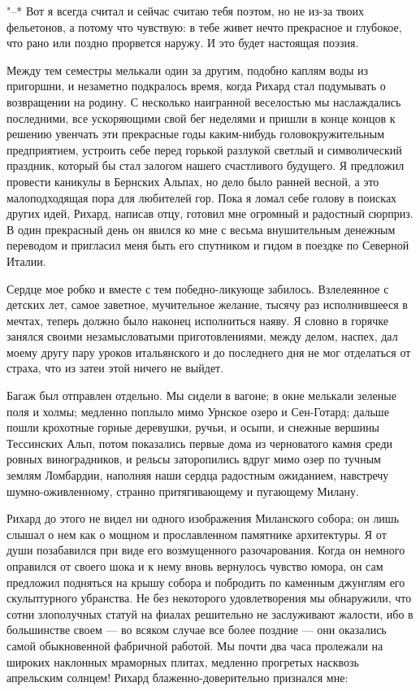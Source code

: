 "--* Вот  я всегда  считал и  сейчас считаю тебя  поэтом, но  не из-за
твоих фельетонов, а потому что чувствую: в тебе живет нечто прекрасное
и  глубокое,  что  рано  или  поздно прорвется  наружу.  И  это  будет
настоящая поэзия.

Между тем  семестры мелькали  один за другим,  подобно каплям  воды из
пригоршни, и незаметно подкралось  время, когда Рихард стал подумывать
о  возвращении  на  родину.   С  несколько  наигранной  веселостью  мы
наслаждались последними, все ускоряющими свой  бег неделями и пришли в
конце  концов  к решению  увенчать  эти  прекрасные годы  каким-нибудь
головокружительным предприятием, устроить  себе перед горькой разлукой
светлый  и  символический праздник,  который  бы  стал залогом  нашего
счастливого будущего. Я предложил провести каникулы в Бернских Альпах,
но дело  было ранней весной,  а это малоподходящая пора  для любителей
гор. Пока я  ломал себе голову в поисках других  идей, Рихард, написав
отцу, готовил мне огромный и радостный сюрприз. В один прекрасный день
он явился ко мне с  весьма внушительным денежным переводом и пригласил
меня быть его спутником и гидом в поездке по Северной Италии.

Сердце мое робко и вместе  с тем победно-ликующе забилось. Взлелеянное
с  детских  лет,  самое  заветное,  мучительное  желание,  тысячу  раз
исполнившееся в мечтах, теперь  должно было наконец исполниться наяву.
Я  словно в  горячке занялся  своими незамысловатыми  приготовлениями,
между делом,  наспех, дал  моему другу пару  уроков итальянского  и до
последнего дня не  мог отделаться от страха, что из  затеи этой ничего
не выйдет.

Багаж  был отправлен  отдельно. Мы  сидели в  вагоне; в  окне мелькали
зеленые  поля  и   холмы;  медленно  поплыло  мимо   Урнское  озеро  и
Сен-Готард;  дальше   пошли  крохотные  горные  деревушки,   ручьи,  и
осыпи,  и снежные  вершины  Тессинских Альп,  потом показались  первые
дома  из  черноватого  камня  среди  ровных  виноградников,  и  рельсы
заторопились  вдруг мимо  озер  по тучным  землям Ломбардии,  наполняя
наши сердца радостным  ожиданием, навстречу шумно-оживленному, странно
притягивающему и пугающему Милану.

Рихард до этого  не видел ни одного изображения  Миланского собора; он
лишь слышал о нем как  о мощном и прославленном памятнике архитектуры.
Я от души  позабавился при виде его  возмущенного разочарования. Когда
он немного оправился  от своего шока и к нему  вновь вернулось чувство
юмора,  он сам  предложил подняться  на  крышу собора  и побродить  по
каменным  джунглям  его  скульптурного убранства.  Не  без  некоторого
удовлетворения мы  обнаружили, что сотни злополучных  статуй на фиалах
решительно  не заслуживают  жалости, ибо  в большинстве  своем ---  во
всяком случае все  более поздние --- они  оказались самой обыкновенной
фабричной работой.  Мы почти два  часа пролежали на  широких наклонных
мраморных  плитах,  медленно  прогретых насквозь  апрельским  солнцем!
Рихард блаженно-доверительно признался мне:

